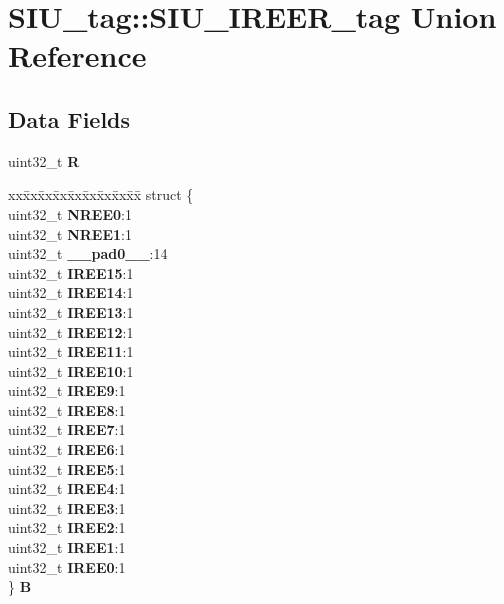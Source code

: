 \hypertarget{unionSIU__tag_1_1SIU__IREER__tag}{}\section{S\+I\+U\+\_\+tag\+::S\+I\+U\+\_\+\+I\+R\+E\+E\+R\+\_\+tag Union Reference}
\label{unionSIU__tag_1_1SIU__IREER__tag}
\subsection*{Data Fields}
\begin{DoxyCompactItemize}
\item 
\mbox{\label{unionSIU__tag_1_1SIU__IREER__tag_ad57aa28d796fdbed85cd3619ed2c3ae2}} 
uint32\+\_\+t {\bfseries R}
\item 
\mbox{\label{unionSIU__tag_1_1SIU__IREER__tag_aa21f4b015334d5339624815dc4fa1f65}} 
\begin{tabbing}
xx\=xx\=xx\=xx\=xx\=xx\=xx\=xx\=xx\=\kill
struct \{\\
\>uint32\_t {\bfseries NREE0}:1\\
\>uint32\_t {\bfseries NREE1}:1\\
\>uint32\_t {\bfseries \_\_pad0\_\_}:14\\
\>uint32\_t {\bfseries IREE15}:1\\
\>uint32\_t {\bfseries IREE14}:1\\
\>uint32\_t {\bfseries IREE13}:1\\
\>uint32\_t {\bfseries IREE12}:1\\
\>uint32\_t {\bfseries IREE11}:1\\
\>uint32\_t {\bfseries IREE10}:1\\
\>uint32\_t {\bfseries IREE9}:1\\
\>uint32\_t {\bfseries IREE8}:1\\
\>uint32\_t {\bfseries IREE7}:1\\
\>uint32\_t {\bfseries IREE6}:1\\
\>uint32\_t {\bfseries IREE5}:1\\
\>uint32\_t {\bfseries IREE4}:1\\
\>uint32\_t {\bfseries IREE3}:1\\
\>uint32\_t {\bfseries IREE2}:1\\
\>uint32\_t {\bfseries IREE1}:1\\
\>uint32\_t {\bfseries IREE0}:1\\
\} {\bfseries B}\\


\end{tabbing}
\end{DoxyCompactItemize}
